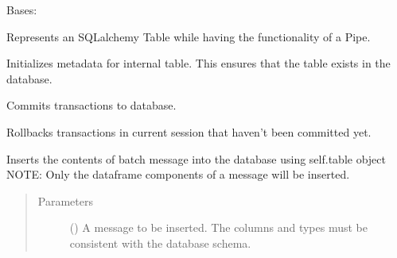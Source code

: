 \documentclass[letterpaper,10pt,english]{sphinxmanual}
\begin{document}
\begin{fulllineitems}
\label{\detokenize{Fireworks:Fireworks.extensions.database.TablePipe}}
Bases: {\hyperref[\detokenize{Fireworks:Fireworks.core.pipe.Pipe}]{}}

Represents an SQLalchemy Table while having the functionality of a Pipe.

\begin{fulllineitems}
\label{\detokenize{Fireworks:Fireworks.extensions.database.TablePipe.init_db}}
Initializes metadata for internal table. This ensures that the table exists in the database.

\end{fulllineitems}


\begin{fulllineitems}
\label{\detokenize{Fireworks:Fireworks.extensions.database.TablePipe.commit}}
Commits transactions to database.

\end{fulllineitems}


\begin{fulllineitems}
\label{\detokenize{Fireworks:Fireworks.extensions.database.TablePipe.rollback}}
Rollbacks transactions in current session that haven’t been committed yet.

\end{fulllineitems}


\begin{fulllineitems}
\label{\detokenize{Fireworks:Fireworks.extensions.database.TablePipe.insert}}
Inserts the contents of batch message into the database using self.table object
NOTE: Only the dataframe components of a message will be inserted.
\begin{quote}\begin{description}
\item[{Parameters}] \leavevmode
{} ({\hyperref[\detokenize{Fireworks:Fireworks.core.message.Message}]{}}) \textendash{} A message to be inserted. The columns and types must be consistent with the database schema.


\end{description}
\end{quote}
\end{fulllineitems}
\end{fulllineitems}
\end{document}
